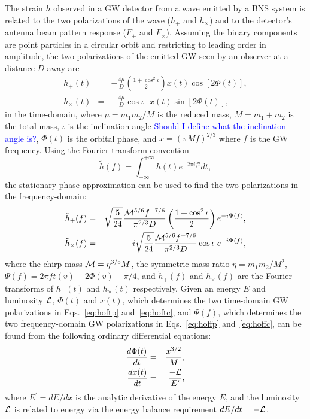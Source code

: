 \documentclass[twocolumn,prd,amssymb,aps,nofootinbib,showpacs,epsf]{revtex4}
\newcommand\les[2]{\textcolor{blue}{{#1}\sout{#2}}}
\begin{document}
The strain $h$ observed in a GW detector from a wave emitted by a BNS system is related to the two polarizations of the wave ($h_+$ and $h_\times$) and to the detector's antenna beam pattern response ($F_+$ and $F_\times$).  Assuming the binary components are point particles in a circular orbit and restricting to leading order in amplitude, the two polarizations of the emitted GW seen by an observer at a distance $D$ away are
\begin{eqnarray}
\label{eq:hoftp}
h_+(t)&=&-\frac{4\mu}{D}\left(\frac{1+\cos^2\iota}{2}\right)x(t)\cos\left[2\Phi(t)\right],\\
\label{eq:hoftc}
h_\times(t)&=&-\frac{4\mu}{D}\cos\iota\mbox{ }x(t)\sin\left[2\Phi(t)\right],
\end{eqnarray}
in the time-domain, where $\mu=m_1 m_2/M$ is the reduced mass, $M=m_1+m_2$ is the total mass, $\iota$ is the inclination angle \les{Should I define what the inclination angle is?}{}, $\Phi(t)$ is the orbital phase, and $x=(\pi M f)^{2/3}$ where $f$ is the GW frequency.  Using the Fourier transform convention
\begin{equation}
\tilde{h}(f)=\int_{-\infty}^{+\infty} h(t) e^{-2\pi i f t}dt,
\end{equation}
the stationary-phase approximation can be used to find the two polarizations in the frequency-domain:
\begin{eqnarray}
\label{eq:hoffp}
\tilde{h}_+(f)&=&\sqrt{\frac{5}{24}}\frac{{\cal M}^{5/6}f^{-7/6}}{\pi^{2/3}D}\left(\frac{1+\cos^2\iota}{2}\right)e^{-i\Psi(f)},\\
\label{eq:hoffc}
\tilde{h}_\times(f)&=&-i\sqrt{\frac{5}{24}}\frac{{\cal M}^{5/6}f^{-7/6}}{\pi^{2/3}D}\cos\iota\mbox{ }e^{-i\Psi(f)},
\end{eqnarray}
where the chirp mass ${\cal M}=\eta^{3/5}M$, the symmetric mass ratio $\eta=m_1 m_2/M^2$, $\Psi(f)=2\pi f t(v) - 2\Phi(v) - \pi/4$, and $\tilde{h}_+(f)$ and $\tilde{h}_\times(f)$ are the Fourier transforms of $h_+(t)$ and $h_\times(t)$ respectively.  Given an energy $E$ and luminosity ${\cal L}$, $\Phi(t)$ and $x(t)$, which determines the two time-domain GW polarizations in Eqs.~\eqref{eq:hoftp} and~\eqref{eq:hoftc}, and $\Psi(f)$, which determines the two frequency-domain GW polarizations in Eqs.~\eqref{eq:hoffp} and~\eqref{eq:hoffc}, can be found from the following ordinary differential equations:
\begin{eqnarray}
\label{eq:dPhidt}
\frac{d\Phi(t)}{dt}&=&\frac{x^{3/2}}{M},\\
\label{eq:dxdt}
\frac{d x(t)}{dt}&=&\frac{-{\cal L}}{E^{\prime}},
\end{eqnarray}
where $E^{\prime}=dE/dx$ is the analytic derivative of the energy $E$, and the luminosity ${\cal L}$ is related to energy via the energy balance requirement $dE/dt=-{\cal L}$.
\end{document}
